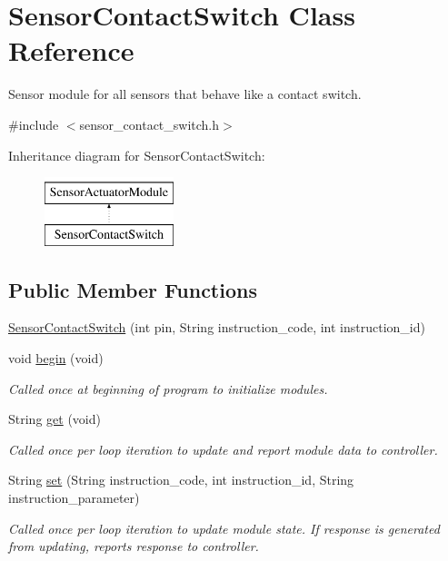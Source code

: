 \hypertarget{class_sensor_contact_switch}{}\section{Sensor\+Contact\+Switch Class Reference}
\label{class_sensor_contact_switch}


Sensor module for all sensors that behave like a contact switch.  




{\ttfamily \#include $<$sensor\+\_\+contact\+\_\+switch.\+h$>$}

Inheritance diagram for Sensor\+Contact\+Switch\+:\begin{figure}[H]
\begin{center}
\leavevmode
\includegraphics[height=2.000000cm]{class_sensor_contact_switch}
\end{center}
\end{figure}
\subsection*{Public Member Functions}
\begin{DoxyCompactItemize}
\item 
\hyperlink{class_sensor_contact_switch_a821878d797ea7b94dd2870f98df8fdf5}{Sensor\+Contact\+Switch} (int pin, String instruction\+\_\+code, int instruction\+\_\+id)
\item 
void \hyperlink{class_sensor_contact_switch_a037d866b1e40776cc6fa00a46169b150}{begin} (void)
\begin{DoxyCompactList}\small\item\em Called once at beginning of program to initialize modules. \end{DoxyCompactList}\item 
String \hyperlink{class_sensor_contact_switch_a99a5906b45ed441eea56fb2960d35191}{get} (void)
\begin{DoxyCompactList}\small\item\em Called once per loop iteration to update and report module data to controller. \end{DoxyCompactList}\item 
String \hyperlink{class_sensor_contact_switch_ab49acd5d6132eed50d7342717649abc2}{set} (String instruction\+\_\+code, int instruction\+\_\+id, String instruction\+\_\+parameter)
\begin{DoxyCompactList}\small\item\em Called once per loop iteration to update module state. If response is generated from updating, reports response to controller. \end{DoxyCompactList}\end{DoxyCompactItemize}
